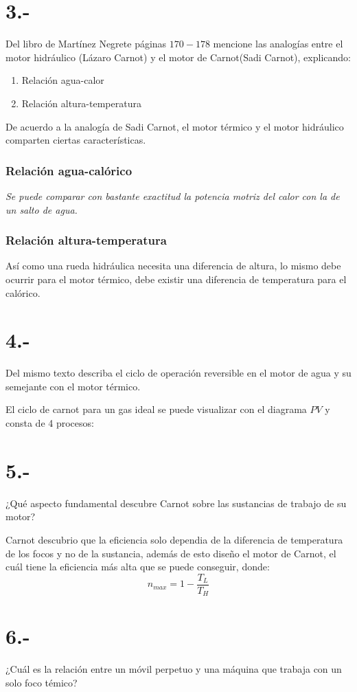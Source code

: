 \documentclass{article}
\begin{document}
\section*{3.-}
Del libro de Martínez Negrete páginas $170-178$ mencione las analogías entre el motor hidráulico
(Lázaro Carnot) y el motor de Carnot(Sadi Carnot), explicando:
\begin{enumerate}
    \item Relación agua-calor 
    \item Relación altura-temperatura
\end{enumerate}
\begin{tcolorbox}[breakable]
    De acuerdo a la analogía de Sadi Carnot, el motor térmico y el motor hidráulico comparten ciertas 
    características.
    \subsubsection*{Relación agua-calórico}
    \textit{Se puede comparar con bastante exactitud la potencia motriz del calor con la de un salto de agua.}
    \subsubsection*{Relación altura-temperatura}
    Así como una rueda hidráulica necesita una diferencia de altura, lo mismo debe ocurrir para el motor 
    térmico, debe existir una diferencia de temperatura para el calórico. 
\end{tcolorbox}

\section*{4.-}
Del mismo texto describa el ciclo de operación reversible en el motor de agua y su semejante con el motor térmico.
\begin{tcolorbox}[breakable]
    El ciclo de carnot para un gas ideal se puede visualizar con el diagrama $PV$ y consta de 4 procesos:
    
\end{tcolorbox}

\section*{5.-}
¿Qué aspecto fundamental descubre Carnot sobre las sustancias de trabajo de su motor?
\begin{tcolorbox}[breakable]
    Carnot descubrio que la eficiencia solo dependia de la diferencia de temperatura de los focos y no de la sustancia, 
    además de esto diseño el motor de Carnot, el cuál tiene la eficiencia más alta que se puede conseguir, donde:
    \[ n_{max} = 1 - \frac{T_L}{T_H} \]
\end{tcolorbox}

\section*{6.-}
¿Cuál es la relación entre un móvil perpetuo y una máquina que trabaja con un solo foco témico?
\begin{tcolorbox}[breakable]

\end{tcolorbox}
\end{document}
